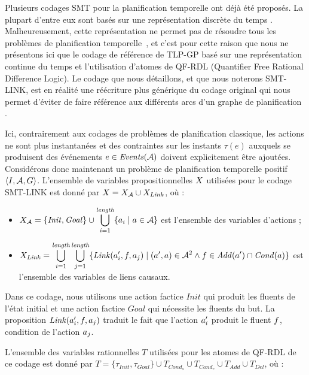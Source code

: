 %
%

Plusieurs codages SMT pour la planification temporelle ont déjà été proposés. La plupart d'entre eux sont basés sur une représentation discrète du temps \cite{DBLP:journals/ai/ShinD05,DBLP:conf/aaai/Rintanen15}. Malheureusement, cette représentation ne permet pas de résoudre tous les problèmes de planification temporelle~\cite{DBLP:journals/ci/CooperMR13}, et c'est pour cette raison que nous ne présentons ici que le codage de référence de TLP-GP \cite{DBLP:conf/ictai/MarisR08} basé sur une représentation continue du temps et l'utilisation d'atomes de QF-RDL (Quantifier Free Rational Difference Logic). Le codage que nous détaillons, et que nous noterons SMT-LINK, est en réalité une réécriture plus générique du codage original qui nous permet d'éviter de faire référence aux différents arcs d'un graphe de planification \cite{BF95,BF97}.

Ici, contrairement aux codages de problèmes de planification classique, les actions ne sont plus instantanées et des contraintes sur les instants $\tau(e)$ auxquels se produisent des événements $e\in\mathit{Events}(\mathcal{A})$ doivent explicitement être ajoutées.
Considérons donc maintenant un problème de planification temporelle positif $\langle I, \mathcal{A}, G \rangle$.
L'ensemble de variables propositionnelles $X$ utilisées pour le codage SMT-LINK est donné par $X = X_{\mathcal{A}} \cup X_{\mathit{Link}}$, où :
\begin{itemize}
    \item $\displaystyle X_{\mathcal{A}}=\{\mathit{Init}, \mathit{Goal}\} \cup \bigcup_{i=1}^{\textit{length}}\{a_{i}\mid a\in\mathcal{A}\}$ est l'ensemble des variables d'actions ;
    \item $\displaystyle X_{\mathit{Link}}=\bigcup_{i=1}^{\textit{length}}\bigcup_{j=1}^{\textit{length}}\{\mathit{Link}(a'_{i},f,a_{j})\mid (a',a)\in \mathcal{A}^{2} \wedge f\in\mathit{Add}(a')\cap\mathit{Cond}(a)\}$ est l'ensemble des variables de liens causaux.
\end{itemize}

Dans ce codage, nous utilisons une action factice $\mathit{Init}$ qui produit les fluents de l'état initial et une action factice $\mathit{Goal}$ qui nécessite les fluents du but. La proposition $\mathit{Link}(a'_{i},f,a_{j})$ traduit le fait que l'action $a'_{i}$ produit le fluent
$f$, condition de l'action $a_{j}$.

L'ensemble des variables rationnelles $T$ utilisées pour les atomes de QF-RDL de ce codage est donné par $\displaystyle T=\{\tau_{\mathit{Init}}, \tau_{\mathit{Goal}}\} \cup T_{\mathit{Cond_{s}}} \cup T_{\mathit{Cond_{e}}} \cup T_{\mathit{Add}} \cup T_{\mathit{Del}}$, où :

